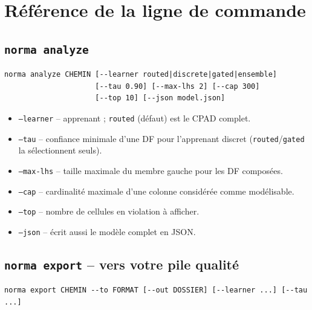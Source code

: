 \documentclass[11pt,a4paper]{article}
\newcommand{\code}[1]{\texttt{#1}}
\begin{document}
\section{Référence de la ligne de commande}

\subsection{\code{norma analyze}}
\begin{lstlisting}
norma analyze CHEMIN [--learner routed|discrete|gated|ensemble]
                     [--tau 0.90] [--max-lhs 2] [--cap 300]
                     [--top 10] [--json model.json]
\end{lstlisting}
\begin{itemize}[nosep,leftmargin=1.4em]
  \item \code{--learner} -- apprenant ; \code{routed} (défaut) est le CPAD complet.
  \item \code{--tau} -- confiance minimale d'une DF pour l'apprenant discret (\code{routed}/\code{gated} la sélectionnent seuls).
  \item \code{--max-lhs} -- taille maximale du membre gauche pour les DF composées.
  \item \code{--cap} -- cardinalité maximale d'une colonne considérée comme modélisable.
  \item \code{--top} -- nombre de cellules en violation à afficher.
  \item \code{--json} -- écrit aussi le modèle complet en JSON.
\end{itemize}

\subsection{\code{norma export} -- vers votre pile qualité}
\begin{lstlisting}
norma export CHEMIN --to FORMAT [--out DOSSIER] [--learner ...] [--tau ...]
\end{lstlisting}
\end{document}

